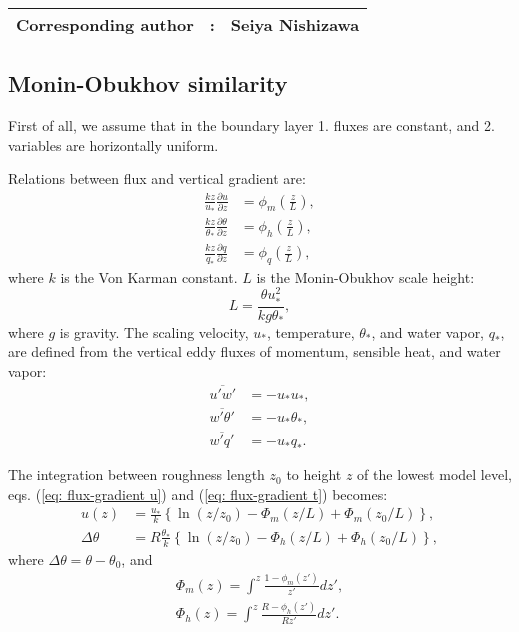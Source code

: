 {\bf \Large 
\begin{tabular}{ccc}
\hline
  Corresponding author & : & Seiya Nishizawa\\
\hline
\end{tabular}
}


\subsection{Monin-Obukhov similarity}
First of all, we assume that in the boundary layer
1. fluxes are constant, and 2. variables are horizontally uniform.

Relations between flux and vertical gradient are:
\begin{align}
  \frac{kz}{u_*} \frac{\partial u}{\partial z} &= \phi_m\left(\frac{z}{L}\right), \label{eq: flux-gradient u} \\
  \frac{kz}{\theta_*} \frac{\partial \theta}{\partial z} &= \phi_h\left(\frac{z}{L}\right), \label{eq: flux-gradient t} \\
  \frac{kz}{q_*} \frac{\partial q}{\partial z} &= \phi_q\left(\frac{z}{L}\right),
\end{align}
where $k$ is the Von Karman constant.
$L$ is the Monin-Obukhov scale height:
\begin{equation}
  L = \frac{\theta u_*^2}{kg\theta_*},
\end{equation}
where $g$ is gravity.
The scaling velocity, $u_*$, temperature, $\theta_*$,
and water vapor, $q_*$, are defined from the vertical eddy fluxes of momentum, sensible heat, and water vapor:
\begin{align}
  \overline{u'w'} &= -u_*u_*, \\
  \overline{w'\theta'} &= - u_*\theta_*, \\
  \overline{w'q'} &= - u_*q_*.
\end{align}

The integration between roughness length $z_0$ to height $z$ of the lowest model level, eqs. (\ref{eq: flux-gradient u}) and (\ref{eq: flux-gradient t}) becomes:
\begin{align}
  u(z) &= \frac{u_*}{k} \left\{\ln(z/z_0)-\Phi_m(z/L)+\Phi_m(z_0/L)\right\}, \\
  \Delta\theta &= R\frac{\theta_*}{k} \left\{\ln(z/z_0)-\Phi_h(z/L)+\Phi_h(z_0/L)\right\},
\end{align}
where $\Delta\theta = \theta-\theta_0$,
and
\begin{align}
  \Phi_m(z) = \int^z \frac{1-\phi_m(z')}{z'} dz', \\
  \Phi_h(z) = \int^z \frac{R-\phi_h(z')}{R z'} dz'.
\end{align}


